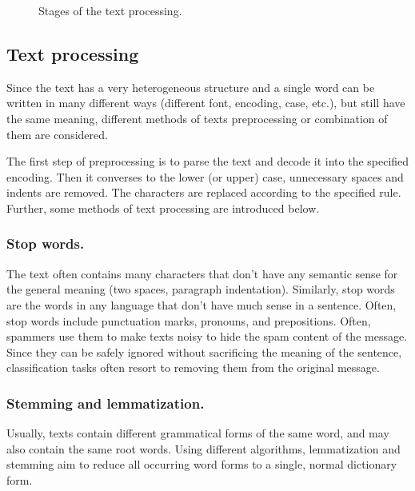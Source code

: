 \documentclass[12pt]{jpconf}
\begin{document}
\begin{figure}[h!]
\centering
{}
\caption{\label{fig:00}Stages of the text processing.}
\end{figure}

\subsection{Text processing}
Since the text has a very heterogeneous structure and a single word can be written in many different ways (different font, encoding, case, etc.), but still have the same meaning, different methods of texts preprocessing or combination of them are considered.

The first step of preprocessing is to parse the text and decode it into the specified encoding. Then it converses to the lower (or upper) case, unnecessary spaces and indents are removed. The characters are replaced according to the specified rule. Further, some methods of text processing are introduced below.

\subsubsection*{Stop words.}
The text often contains many characters that don't have any semantic sense for the general meaning (two spaces, paragraph indentation).
Similarly, stop words are the words in any language that don't have much sense in a sentence. Often, stop words include punctuation marks, pronouns, and prepositions. Often, spammers use them to make texts noisy to hide the spam content of the message. Since they can be safely ignored without sacrificing the meaning of the sentence, classification tasks often resort to removing them from the original message.

\subsubsection*{Stemming and lemmatization.}
Usually, texts contain different grammatical forms of the same word, and may also contain the same root words. Using different algorithms, lemmatization and stemming aim to reduce all occurring word forms to a single, normal dictionary form.
\end{document}
